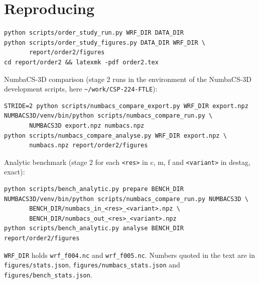 \documentclass[11pt,a4paper]{article}
\begin{document}
\section{Reproducing}
\begin{verbatim}
python scripts/order_study_run.py WRF_DIR DATA_DIR
python scripts/order_study_figures.py DATA_DIR WRF_DIR \
       report/order2/figures
cd report/order2 && latexmk -pdf order2.tex
\end{verbatim}
NumbaCS-3D comparison (stage 2 runs in the environment of the NumbaCS-3D
development scripts, here \texttt{\textasciitilde/work/CSP-224-FTLE}):
\begin{verbatim}
STRIDE=2 python scripts/numbacs_compare_export.py WRF_DIR export.npz
NUMBACS3D/venv/bin/python scripts/numbacs_compare_run.py \
       NUMBACS3D export.npz numbacs.npz
python scripts/numbacs_compare_analyse.py WRF_DIR export.npz \
       numbacs.npz report/order2/figures
\end{verbatim}
Analytic benchmark (stage 2 for each \texttt{<res>} in c, m, f and
\texttt{<variant>} in destag, exact):
\begin{verbatim}
python scripts/bench_analytic.py prepare BENCH_DIR
NUMBACS3D/venv/bin/python scripts/numbacs_compare_run.py NUMBACS3D \
       BENCH_DIR/numbacs_in_<res>_<variant>.npz \
       BENCH_DIR/numbacs_out_<res>_<variant>.npz
python scripts/bench_analytic.py analyse BENCH_DIR report/order2/figures
\end{verbatim}
{\sloppy
\texttt{WRF\_DIR} holds \texttt{wrf\_f004.nc} and \texttt{wrf\_f005.nc}.
Numbers quoted in the text are in \texttt{figures/stats.json}, \texttt{figures/numbacs\_stats.json} and \texttt{figures/bench\_stats.json}.\par}
\end{document}

